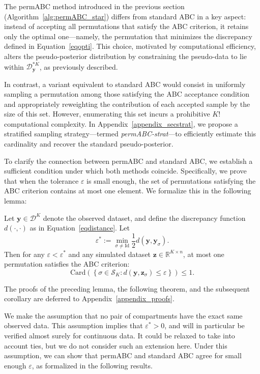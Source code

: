 \documentclass[lineno]{biometrika}
\def\dataspace{\mathcal{D}}
\def\obsdata{\mathbf{y}}
\def\simdata{\mathbf{z}}
\begin{document}
The permABC method introduced in the previous section (Algorithm~\ref{alg:permABC_star}) differs from standard ABC in a key aspect: instead of accepting all permutations that satisfy the ABC criterion, it retains only the optimal one—namely, the permutation that minimizes the discrepancy defined in Equation~\eqref{eqopti}. This choice, motivated by computational efficiency, alters the pseudo-posterior distribution by constraining the pseudo-data to lie within $\dataspace^{*K}_{\obsdata}$, as previously described.


In contrast, a variant equivalent to standard ABC would consist in uniformly sampling a permutation among those satisfying the ABC acceptance condition and appropriately reweighting the contribution of each accepted sample by the size of this set. However, enumerating this set incurs a prohibitive $K!$ computational complexity. In Appendix~\ref{appendix_secstrat}, we propose a stratified sampling strategy—termed \emph{permABC-strat}—to efficiently estimate this cardinality and recover the standard pseudo-posterior.

To clarify the connection between permABC and standard ABC, we establish a sufficient condition under which both methods coincide. Specifically, we prove that when the tolerance $\varepsilon$ is small enough, the set of permutations satisfying the ABC criterion contains at most one element. We formalize this in the following lemma:

\begin{lemma}
\label{lempermABC_star}
Let $\obsdata \in \dataspace^K$ denote the observed dataset, and define the discrepancy function $d(\cdot, \cdot)$ as in Equation~\eqref{eqdistance}. Let
\[
\varepsilon^* := \min_{\sigma \neq \mathrm{Id}} \frac{1}{2} d(\obsdata, \obsdata_\sigma).
\]
Then for any $\varepsilon < \varepsilon^*$ and any simulated dataset $\simdata \in \mathbb{R}^{K \times n}$, at most one permutation satisfies the ABC criterion:
\[
\mathrm{Card} \left( \left\{ \sigma \in \mathcal{S}_K : d(\obsdata, \simdata_\sigma) \leq \varepsilon \right\} \right) \leq 1.
\]
\end{lemma}

The proofs of the preceding lemma, the following theorem, and the subsequent corollary are deferred to Appendix~\ref{appendix_proofs}. 

We make the assumption that no pair of compartments have the exact same observed data. This assumption implies that $\varepsilon^*>0$, and will in particular be verified almost surely for continuous data. It could be relaxed to take into account ties, but we do not consider such an extension here. Under this assumption, we can show that permABC and standard ABC agree for small enough $\varepsilon$, as formalized in the following results.
\end{document}
